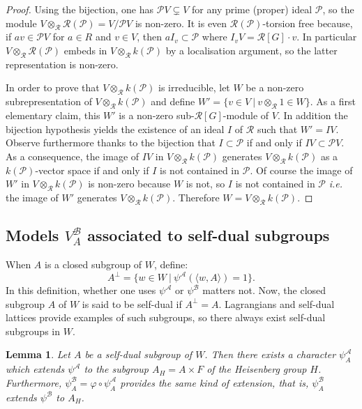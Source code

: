 \documentclass[11pt]{article}
\theoremstyle{plain}
\newtheorem{lem}[theo]{Lemma}
\theoremstyle{definition}
\theoremstyle{plain}
\theoremstyle{definition}
\theoremstyle{plain}
\begin{document}
\begin{proof} Using the bijection, one has $\mathcal{P} V \subsetneq V$ for any prime (proper) ideal $\mathcal{P}$, so the module $V \otimes_\mathcal{R} \mathcal{R}(\mathcal{P}) = V / \mathcal{P} V$ is non-zero. It is even $\mathcal{R}(\mathcal{P})$-torsion free because, if $a v \in \mathcal{P} V$ for $a \in R$ and $v \in V$, then $a I_v \subset \mathcal{P}$ where $I_v V = \mathcal{R}[G] \cdot v$. In particular $V \otimes_\mathcal{R} \mathcal{R}(\mathcal{P})$ embeds in $V \otimes_\mathcal{R} k(\mathcal{P})$ by a localisation argument, so the latter representation is non-zero.

In order to prove that $V \otimes_\mathcal{R} k(\mathcal{P})$ is irreducible, let $W$ be a non-zero subrepresentation of $V \otimes_\mathcal{R} k(\mathcal{P})$ and define $W' = \{ v \in V \ | \ v \otimes_\mathcal{R} 1 \in W \}$. As a first elementary claim, this $W'$ is a non-zero sub-$\mathcal{R}[G]$-module of $V$. In addition the bijection hypothesis yields the existence of an ideal $I$ of $\mathcal{R}$ such that $W'=I V$. Observe furthermore thanks to the bijection that $I \subset \mathcal{P}$ if and only if $IV \subset \mathcal{P} V$. As a consequence, the image of $IV$ in $V \otimes_\mathcal{R} k(\mathcal{P})$ generates $V \otimes_\mathcal{R} k(\mathcal{P})$ as a $k(\mathcal{P})$-vector space if and only if $I$ is not contained in $\mathcal{P}$. Of course the image of $W'$ in $V \otimes_\mathcal{R} k(\mathcal{P})$ is non-zero because $W$ is not, so $I$ is not contained in $\mathcal{P}$ \textit{i.e.} the image of $W'$ generates $V \otimes_\mathcal{R} k(\mathcal{P})$. Therefore $W = V \otimes_\mathcal{R} k(\mathcal{P})$.  \end{proof}

\subsection{Models $V_A^\mathcal{B}$ associated to self-dual subgroups} \label{models_associated_to_self_dual_subgp_section}


When $A$ is a closed subgroup of $W$, define:
$$A^\perp = \{ w \in W \ | \ \psi^\mathcal{A}(\langle w, A \rangle) = 1 \}.$$
In this definition, whether one uses $\psi^\mathcal{A}$ or $\psi^\mathcal{B}$ matters not. Now, the closed subgroup $A$ of $W$ is said to be self-dual if $A^\perp = A$. Lagrangians and self-dual lattices provide examples of such subgroups, so there always exist self-dual subgroups in $W$.

\begin{lem} \label{extension_of_psi_B_lem} Let $A$ be a self-dual subgroup of $W$. Then there exists a character $\psi^\mathcal{A}_A$ which extends $\psi^\mathcal{A}$ to the subgroup $A_H = A \times F$ of the Heisenberg group $H$. Furthermore, $\psi^\mathcal{B}_A = \varphi \circ \psi^\mathcal{A}_A$ provides the same kind of extension, that is, $\psi^\mathcal{B}_A$ extends $\psi^\mathcal{B}$ to $A_H$. \end{lem}
\end{document}
